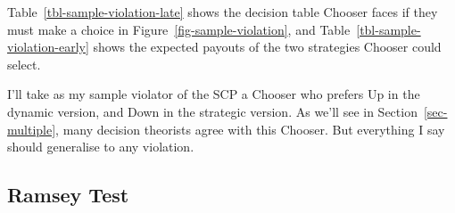 \documentclass[
  10pt,
  letterpaper,
  DIV=11,
  numbers=noendperiod,
  twoside]{scrartcl}
\begin{document}
Table~\ref{tbl-sample-violation-late} shows the decision table Chooser
faces if they must make a choice in Figure~\ref{fig-sample-violation},
and Table~\ref{tbl-sample-violation-early} shows the expected payouts of
the two strategies Chooser could select.

\begin{table}

\caption{\label{tbl-sample-violation}Payout tables for
Figure~\ref{fig-sample-violation}.}

\begin{minipage}{0.50\linewidth}



\end{minipage}%
%
\begin{minipage}{0.50\linewidth}



\end{minipage}%

\end{table}%

I'll take as my sample violator of the SCP a Chooser who prefers Up in
the dynamic version, and Down in the strategic version. As we'll see in
Section~\ref{sec-multiple}, many decision theorists agree with this
Chooser. But everything I say should generalise to any violation.

\subsection{Ramsey Test}\label{sec-ramsey}
\end{document}
